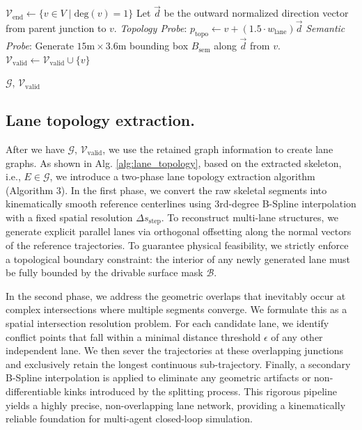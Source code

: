 \begin{algorithm}[h]
\begin{algorithmic}[1]
\State $\mathcal{V}_{\text{end}} \gets \{v \in V \mid \text{deg}(v) = 1 \}$
    \State Let $\vec{d}$ be the outward normalized direction vector from parent junction to $v$.
    \State \textit{Topology Probe}: $p_{\text{topo}} \gets v + (1.5 \cdot w_{\text{lane}}) \vec{d}$
    \State \textit{Semantic Probe}: Generate $15\text{m} \times 3.6\text{m}$ bounding box $B_{\text{sem}}$ along $\vec{d}$ from $v$.
        \State $\mathcal{V}_{\text{valid}} \gets \mathcal{V}_{\text{valid}} \cup \{v\}$ 
    \EndIf
\EndFor

\State \Return $\mathcal{G}$, $\mathcal{V}_{\text{valid}}$
\end{algorithmic}
\end{algorithm}


\subsection{Lane topology extraction.} After we have $\mathcal{G}$, $\mathcal{V}_{\text{valid}}$, we use the retained graph information to create lane graphs.  As shown in Alg. \ref{alg:lane_topology}, based on the extracted skeleton, i.e., $E \in \mathcal{G}$, we introduce a two-phase lane topology extraction algorithm (Algorithm 3). In the first phase, we convert the raw skeletal segments into kinematically smooth reference centerlines using 3rd-degree B-Spline interpolation with a fixed spatial resolution $\Delta s_{\text{step}}$. To reconstruct multi-lane structures, we generate explicit parallel lanes via orthogonal offsetting along the normal vectors of the reference trajectories. To guarantee physical feasibility, we strictly enforce a topological boundary constraint: the interior of any newly generated lane must be fully bounded by the drivable surface mask $\mathcal{B}$.

In the second phase, we address the geometric overlaps that inevitably occur at complex intersections where multiple segments converge. We formulate this as a spatial intersection resolution problem. For each candidate lane, we identify conflict points that fall within a minimal distance threshold $\epsilon$ of any other independent lane. We then sever the trajectories at these overlapping junctions and exclusively retain the longest continuous sub-trajectory. Finally, a secondary B-Spline interpolation is applied to eliminate any geometric artifacts or non-differentiable kinks introduced by the splitting process. This rigorous pipeline yields a highly precise, non-overlapping lane network, providing a kinematically reliable foundation for multi-agent closed-loop simulation. 

